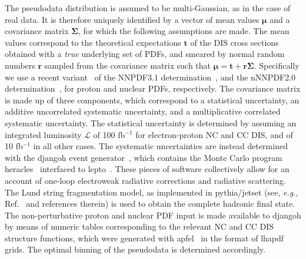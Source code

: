 \documentclass[11pt,a4paper]{article}
\begin{document}
The pseudodata distribution is assumed to be multi-Gaussian, as in the case
of real data. It is therefore uniquely identified by a vector of mean values
$\bm{\mu}$ and a covariance matrix $\bm{\Sigma}$, for which the following
assumptions are made. The mean values correspond to the theoretical expectations
$\bm{t}$ of the DIS cross sections obtained with a {\it true} underlying set of
PDFs, and smeared by normal random numbers $\bm{r}$ sampled from the covariance
matrix such that $\bm{\mu = t + r \Sigma}$. Specifically we use a recent
variant~\cite{Faura:2020oom} of the NNPDF3.1 determination~\cite{Ball:2017nwa},
and the nNNPDF2.0 determination~\cite{AbdulKhalek:2020yuc}, for proton and
nuclear PDFs, respectively. The covariance matrix is made up of three
components, which correspond to a statistical uncertainty, an additive
uncorrelated systematic uncertainty, and a multiplicative correlated
systematic uncertainty. The statistical uncertainty is determined by assuming
an integrated luminosity $\mathcal{L}$ of 100 fb$^{-1}$ for electron-proton
NC and CC DIS, and of 10 fb$^{-1}$ in all other cases. The systematic
uncertainties are instead determined with the {\sc djangoh} event
generator~\cite{Charchula:1994kf}, which contains the Monte Carlo program
{\sc heracles}~\cite{Kwiatkowski:1990es} interfaced to
{\sc lepto}~\cite{Ingelman:1996mq}. These pieces of software collectively allow
for an account of one-loop electroweak radiative corrections and radiative
scattering. The Lund string fragmentation model, as implemented in
{\sc pythia/jetset} (see, {\it e.g.}, Ref.~\cite{Sjostrand:2019zhc} and
references therein) is used to obtain the complete hadronic final state.
The non-perturbative proton and nuclear PDF input is made available to
{\sc djangoh} by means of numeric tables corresponding to the relevant NC and
CC DIS structure functions, which were generated with
{\sc apfel}~\cite{Bertone:2013vaa} in the format of
{\sc lhapdf}~\cite{Buckley:2014ana} grids. The optimal binning of the pseudodata
is determined accordingly.
\end{document}
